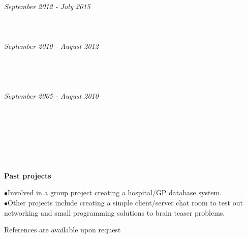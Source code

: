 \documentclass[11pt]{article}
\begin{document}
\\
 \\
\\
\textit{September 2012 - July 2015} \\ 
 \\
 \\ 
\\
\textit{September 2010 - August 2012}   \\ 
  \\ 
 \\
\\
\\
\textit{September 2005 - August 2010}   \\
\\ 
\\
\\
\\
\\
\\
\\
\textbf{Past projects}

\noindent $\bullet$Involved in a group project creating a hospital/GP database system. \\
$\bullet$Other projects include creating a simple client/server chat room to test out networking and small programming solutions to brain teaser problems. \\

\centerline{References are available upon request}
\end{document}
